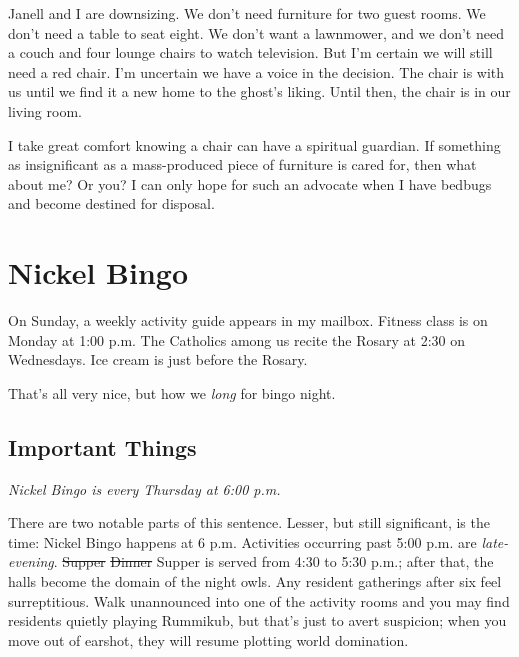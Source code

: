 \documentclass[
  letterpaper,
  DIV=11,
  numbers=noendperiod]{scrreprt}
\begin{document}

Janell and I are downsizing. We don't need furniture for two guest
rooms. We don't need a table to seat eight. We don't want a lawnmower,
and we don't need a couch and four lounge chairs to watch television.
But I'm certain we will still need a red chair. I'm uncertain we have a
voice in the decision. The chair is with us until we find it a new home
to the ghost's liking. Until then, the chair is in our living room.

I take great comfort knowing a chair can have a spiritual guardian. If
something as insignificant as a mass-produced piece of furniture is
cared for, then what about me? Or you? I can only hope for such an
advocate when I have bedbugs and become destined for disposal.


\chapter*{Nickel Bingo}\label{nickel-bingo}


On Sunday, a weekly activity guide appears in my mailbox. Fitness class
is on Monday at 1:00 p.m. The Catholics among us recite the Rosary at
2:30 on Wednesdays. Ice cream is just before the Rosary.

That's all very nice, but how we \emph{long} for bingo night.

\section*{Important Things}\label{important-things}


\emph{Nickel Bingo is every Thursday at 6:00 p.m.}

There are two notable parts of this sentence. Lesser, but still
significant, is the time: Nickel Bingo happens at 6 p.m. Activities
occurring past 5:00 p.m. are \emph{late-evening}. \st{Supper}
\st{Dinner} Supper is served from 4:30 to 5:30 p.m.; after that, the
halls become the domain of the night owls. Any resident gatherings after
six feel surreptitious. Walk unannounced into one of the activity rooms
and you may find residents quietly playing Rummikub, but that's just to
avert suspicion; when you move out of earshot, they will resume plotting
world domination.
\end{document}
